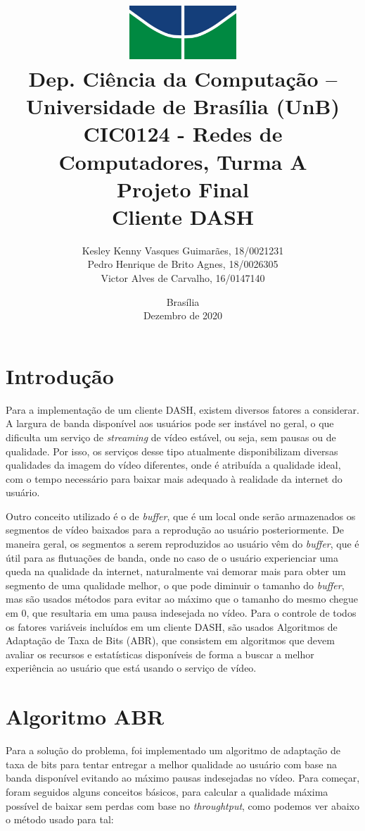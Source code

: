 \documentclass[12pt]{article}
\title{
        \includegraphics[width=4cm]{img/logo.jpg} \\ 
        \large
        Dep. Ciência da Computação -- Universidade de Brasília (UnB)\\
        CIC0124 - Redes de Computadores, Turma A \\
        \vfill 
        \vfill
        \LARGE
        \textbf{Projeto Final\\
        Cliente DASH}
        \vfill
    }
\author{
        Kesley Kenny Vasques Guimarães, 18/0021231\\
        Pedro Henrique de Brito Agnes, 18/0026305\\
        Victor Alves de Carvalho, 16/0147140
    }
\affil{
        \vfill
        \vfill
        \vfill
        Professor \\
        Dr. Marcos Fagundes Caetano
    }
\date{Brasília\\Dezembro de 2020}
\begin{document}
\maketitle
\newpage


\section{Introdução}
Para a implementação de um cliente DASH, existem diversos fatores a considerar. A largura de banda disponível aos usuários pode ser instável no geral, o que dificulta um serviço de \textit{streaming} de vídeo estável, ou seja, sem pausas ou de qualidade. Por isso, os serviços desse tipo atualmente disponibilizam diversas qualidades da imagem do vídeo diferentes, onde é atribuída a qualidade ideal, com o tempo necessário para baixar mais adequado à realidade da internet do usuário.

Outro conceito utilizado é o de \textit{buffer}, que é um local onde serão armazenados os segmentos de vídeo baixados para a reprodução ao usuário posteriormente. De maneira geral, os segmentos a serem reproduzidos ao usuário vêm do \textit{buffer}, que é útil para as flutuações de banda, onde no caso de o usuário experienciar uma queda na qualidade da internet, naturalmente vai demorar mais para obter um segmento de uma qualidade melhor, o que pode diminuir o tamanho do \textit{buffer}, mas são usados métodos para evitar ao máximo que o tamanho do mesmo chegue em 0, que resultaria em uma pausa indesejada no vídeo. Para o controle de todos os fatores variáveis incluídos em um cliente DASH, são usados Algoritmos de Adaptação de Taxa de Bits (ABR), que consistem em algoritmos que devem avaliar os recursos e estatísticas disponíveis de forma a buscar a melhor experiência ao usuário que está usando o serviço de vídeo.

\newpage

\section{Algoritmo ABR}
Para a solução do problema, foi implementado um algoritmo de adaptação de taxa de bits para tentar entregar a melhor qualidade ao usuário com base na banda disponível evitando ao máximo pausas indesejadas no vídeo. Para começar, foram seguidos alguns conceitos básicos, para calcular a qualidade máxima possível de baixar sem perdas com base no \textit{throughtput}, como podemos ver abaixo o método usado para tal:
\end{document}
